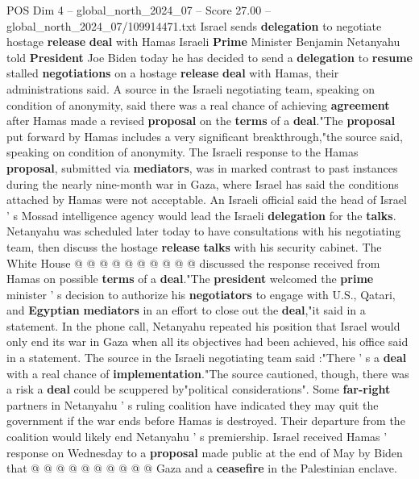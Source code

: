 \begin{textsample}{POS Dim 4 – global\_north\_2024\_07 – Score 27.00 – global\_north\_2024\_07/109914471.txt}  \label{ex:f4_pos_172}
Israel sends \textbf{delegation} to negotiate hostage \textbf{release} \textbf{deal} with Hamas Israeli \textbf{Prime} Minister Benjamin Netanyahu told \textbf{President} Joe Biden today he has decided to send a \textbf{delegation} to \textbf{resume} stalled \textbf{negotiations} on a hostage \textbf{release} \textbf{deal} with Hamas, their administrations said.
A source in the Israeli negotiating team, speaking on condition of anonymity, said there was a real chance of achieving \textbf{agreement} after Hamas made a revised \textbf{proposal} on the \textbf{terms} of a \textbf{deal}."The \textbf{proposal} put forward by Hamas includes a very significant breakthrough,"the source said, speaking on condition of anonymity.
The Israeli response to the Hamas \textbf{proposal}, submitted via \textbf{mediators}, was in marked contrast to past instances during the nearly nine-month war in Gaza, where Israel has said the conditions attached by Hamas were not acceptable.
An Israeli official said the head of Israel ' s Mossad intelligence agency would lead the Israeli \textbf{delegation} for the \textbf{talks}.
Netanyahu was scheduled later today to have consultations with his negotiating team, then discuss the hostage \textbf{release} \textbf{talks} with his security cabinet.
The White House @ @ @ @ @ @ @ @ @ @ discussed the response received from Hamas on possible \textbf{terms} of a \textbf{deal}."The \textbf{president} welcomed the \textbf{prime} minister ' s decision to authorize his \textbf{negotiators} to engage with U.S., Qatari, and \textbf{Egyptian} \textbf{mediators} in an effort to close out the \textbf{deal},"it said in a statement.
In the phone call, Netanyahu repeated his position that Israel would only end its war in Gaza when all its objectives had been achieved, his office said in a statement.
The source in the Israeli negotiating team said :"There ' s a \textbf{deal} with a real chance of \textbf{implementation}."The source cautioned, though, there was a risk a \textbf{deal} could be scuppered by"political considerations".
Some \textbf{far-right} partners in Netanyahu ' s ruling coalition have indicated they may quit the government if the war ends before Hamas is destroyed.
Their departure from the coalition would likely end Netanyahu ' s premiership.
Israel received Hamas ' response on Wednesday to a \textbf{proposal} made public at the end of May by Biden that @ @ @ @ @ @ @ @ @ @ Gaza and a \textbf{ceasefire} in the Palestinian enclave.

\end{textsample}

